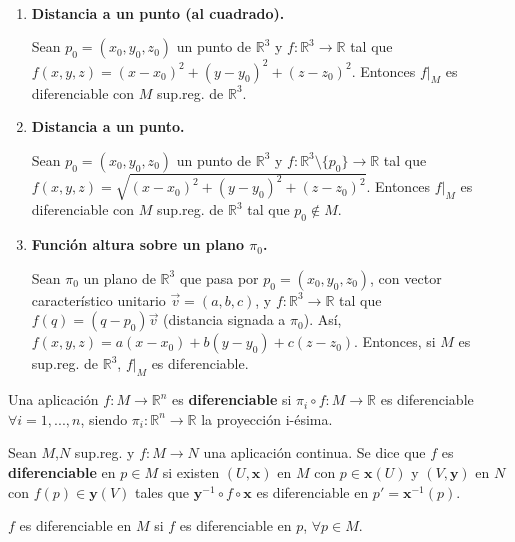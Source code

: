 \documentclass[twoside]{report}
\begin{document}
\begin{ej}

\

\begin{enumerate}
\item \textbf{Distancia a un punto (al cuadrado).}


Sean $p_0=(x_0,y_0,z_0)$ un punto de $\mathbb{R}^3$ y $f: \mathbb{R}^3 \rightarrow \mathbb{R}$ tal que $f(x,y,z)=(x-x_0)^2+(y-y_0)^2+(z-z_0)
^2$. Entonces $f\vert_M$ es diferenciable con $M$ sup.reg. de $\mathbb{R}^3$.

\item \textbf{Distancia a un punto. }

Sean $p_0=(x_0,y_0,z_0)$ un punto de $\mathbb{R}^3$
y $f: \mathbb{R}^3 \setminus\lbrace p_0\rbrace \rightarrow \mathbb{R}$ tal que $f(x,y,z)=\sqrt{(x-x_0)^2+(y-y_0)^2+(z-z_0)
^2}$. Entonces  $f\vert_M$ es diferenciable con $M$ sup.reg. de $\mathbb{R}^3$ tal que $p_0 \notin M$.

\item \textbf{Función altura sobre un plano  $\pi_0$.}

Sean $\pi_0$ un plano de $\mathbb{R}^3$ que pasa por $p_0=(x_0,y_0,z_0)$, con vector característico unitario $\overrightarrow{v}=(a,b,c)$, y $f: \mathbb{R}^3 \rightarrow \mathbb{R}$ tal que $f(q)=(q-p_0)\overrightarrow{v}$ (distancia signada a $\pi_0$). Así, $f(x,y,z)=a(x-x_0)+b(y-y_0)+c(z-z_0)$. Entonces, si $M$ es sup.reg. de $\mathbb{R}^3$, $f\vert_M$ es diferenciable.
\end{enumerate}
\end{ej}

\begin{defi}
Una aplicación $f: M \rightarrow \mathbb{R}^n$ es \textbf{diferenciable} si $\pi_i \circ f: M \rightarrow \mathbb{R}$ es diferenciable $\forall i =1,...,n$, siendo $\pi_i : \mathbb{R}^n \rightarrow \mathbb{R}$ la proyección i-ésima.
\end{defi}

\begin{defi}
Sean $M$,$N$ sup.reg. y $f: M\rightarrow N$ una aplicación continua. Se dice que $f$ es \textbf{diferenciable} en $p\in M$  si existen $(U,\textbf{x})$ en $M$ con $p \in \textbf{x}(U)$ y $(V,\textbf{y})$ en $N$ con $f(p) \in \textbf{y}(V)$ tales que $\textbf{y}^{-1}\circ f \circ \textbf{x}$ es diferenciable en $p' = \textbf{x}^{-1}(p)$.
\end{defi}

\begin{nota}
$f$ es diferenciable en $M$ si $f$ es diferenciable en $p$, $\forall p \in M$.
\end{nota}
\end{document}
